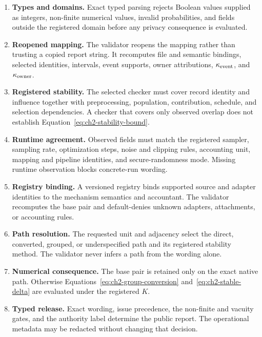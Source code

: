 \begin{enumerate}[label=(\arabic*),leftmargin=*,itemsep=3pt,topsep=4pt]
    \item \textbf{Types and domains.} Exact typed parsing rejects Boolean values
    supplied as integers, non-finite numerical values, invalid probabilities, and
    fields outside the registered domain before any privacy consequence is
    evaluated.

    \item \textbf{Reopened mapping.} The validator reopens the mapping rather than
    trusting a copied report string.  It recomputes file and semantic bindings,
    selected identities, intervals, event supports, owner attributions,
    \(\kappa_{\mathrm{event}}\), and \(\kappa_{\mathrm{owner}}\).

    \item \textbf{Registered stability.} The selected checker must cover record
    identity and influence together with preprocessing, population, contribution,
    schedule, and selection dependencies.  A checker that covers only observed
    overlap does not establish Equation~\eqref{eq:ch2-stability-bound}.

    \item \textbf{Runtime agreement.} Observed fields must match the registered
    sampler, sampling rate, optimization steps, noise and clipping rules,
    accounting unit, mapping and pipeline identities, and secure-randomness mode.
    Missing runtime observation blocks concrete-run wording.

    \item \textbf{Registry binding.} A versioned registry binds supported source
    and adapter identities to the mechanism semantics and accountant.  The
    validator recomputes the base pair and default-denies unknown adapters,
    attachments, or accounting rules.

    \item \textbf{Path resolution.} The requested unit and adjacency select the
    direct, converted, grouped, or underspecified path and its registered
    stability method.  The validator never infers a path from the wording alone.

    \item \textbf{Numerical consequence.} The base pair is retained only on the
    exact native path.  Otherwise Equations~\eqref{eq:ch2-group-conversion}
    and~\eqref{eq:ch2-stable-delta} are evaluated under the registered \(K\).

    \item \textbf{Typed release.} Exact wording, issue precedence, the non-finite
    and vacuity gates, and the authority label determine the public report.  The
    operational metadata may be redacted without changing that decision.
\end{enumerate}

